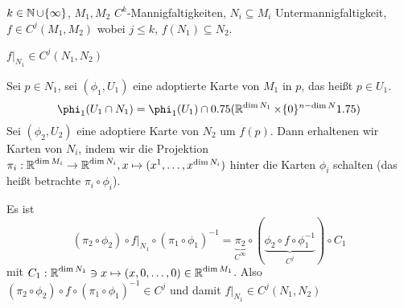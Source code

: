 \begin{Loes}
$k \in \operatorname{\mathbb{N}} \cup \{\infty\}$, $M_1, M_2$ $C^k$-Mannigfaltigkeiten, $N_i \subseteq M_i$ Untermannigfaltigkeit, $f \in C^j(M_1, M_2)$ wobei $j \le k$, $f(N_1) \subseteq N_2$.
\begin{description}[font=\normalfont\itshape]
\item[Behauptung:]
	$f|_{N_1} \in C^j(N_1, N_2)$
\item[Beweis:]
	Sei $p \in N_1$, sei $(\phi_1, U_1)$ eine adoptierte Karte von $M_1$ in $p$, das hei\ss t $p \in U_1$.
		\[ \phi_1(U_1 \cap N_1) = \phi_1(U_1) \cap \left(\R^{\ddim N_1} \times \{0\}^{n-\ddim N}\right) \]
	Sei $(\phi_2, U_2)$ eine adoptiere Karte von $N_2$ um $f(p)$. Dann erhaltenen wir Karten von $N_i$, indem wir die Projektion $\pi_i: \operatorname{\mathbb{R}}^{\operatorname{dim} M_i} \to \operatorname{\mathbb{R}}^{\operatorname{dim} N_i}, x \mapsto (x^1,\ldots ,x^{\operatorname{dim} N_i})$ hinter die Karten $\phi_i$ schalten (das hei\ss t betrachte $\pi_i \circ \phi_i$).
	
	Es ist
		\[(\pi_2 \circ \phi_2) \circ f|_{N_1} \circ (\pi_1 \circ \phi_1)^{-1} = \underbrace{\pi_2}_{C^\infty} \circ (\underbrace{\phi_2 \circ f \circ \phi_1^{-1}}_{C^j}) \circ C_1\]
	mit $C_1: \operatorname{\mathbb{R}}^{\operatorname{dim} N_1} \ni x \mapsto (x, 0,\ldots ,0) \in \operatorname{\mathbb{R}}^{\operatorname{dim} M_1}$. Also $(\pi_2 \circ \phi_2) \circ f \circ (\pi_1 \circ \phi_1)^{-1} \in C^j$ und damit $f|_{N_1} \in C^j(N_1, N_2)$
\end{description}
\end{Loes}

